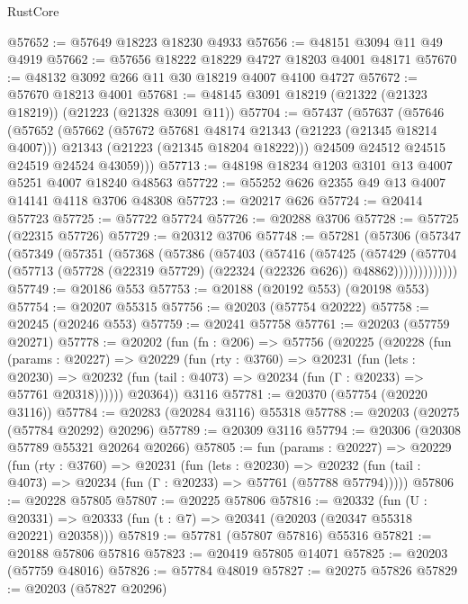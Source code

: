 \begin{lexlean}{RustCore}
\begin{coremodule}
@57652 := @57649 @18223 @18230 @4933
@57656 := @48151 @3094 @11 @49 @4919
@57662 := @57656 @18222 @18229 @4727 @18203 @4001 @48171
@57670 := @48132 @3092 @266 @11 @30 @18219 @4007 @4100 @4727
@57672 := @57670 @18213 @4001
@57681 := @48145 @3091 @18219 (@21322 (@21323 @18219)) (@21223 (@21328 @3091 @11))
@57704 := @57437
    (@57637
      (@57646
        (@57652
          (@57662
            (@57672 @57681 @48174 @21343 (@21223 (@21345 @18214 @4007)))
            @21343
            (@21223 (@21345 @18204 @18222)))
          @24509
          @24512
          @24515
          @24519
          @24524
          @43059)))
@57713 := @48198 @18234 @1203 @3101 @13 @4007 @5251 @4007 @18240 @48563
@57722 := @55252 @626 @2355 @49 @13 @4007 @14141 @4118 @3706 @48308
@57723 := @20217 @626
@57724 := @20414 @57723
@57725 := @57722 @57724
@57726 := @20288 @3706
@57728 := @57725 (@22315 @57726)
@57729 := @20312 @3706
@57748 := @57281
    (@57306
      (@57347
        (@57349
          (@57351
            (@57368
              (@57386
                (@57403
                  (@57416
                    (@57425
                      (@57429
                        (@57704
                          (@57713 (@57728 (@22319 @57729) (@22324 (@22326 @626)) @48862)))))))))))))
@57749 := @20186 @553
@57753 := @20188 (@20192 @553) (@20198 @553)
@57754 := @20207 @55315
@57756 := @20203 (@57754 @20222)
@57758 := @20245 (@20246 @553)
@57759 := @20241 @57758
@57761 := @20203 (@57759 @20271)
@57778 := @20202
    (fun (fn : @206) =>
    @57756
      (@20225
        (@20228
          (fun (params : @20227) =>
          @20229
            (fun (rty : @3760) =>
            @20231
              (fun (lets : @20230) =>
              @20232 (fun (tail : @4073) => @20234 (fun (Γ : @20233) => @57761 @20318))))))
        @20364))
    @3116
@57781 := @20370 (@57754 (@20220 @3116))
@57784 := @20283 (@20284 @3116) @55318
@57788 := @20203 (@20275 (@57784 @20292) @20296)
@57789 := @20309 @3116
@57794 := @20306 (@20308 @57789 @55321 @20264 @20266)
@57805 := fun (params : @20227) =>
  @20229
    (fun (rty : @3760) =>
    @20231
      (fun (lets : @20230) =>
      @20232 (fun (tail : @4073) => @20234 (fun (Γ : @20233) => @57761 (@57788 @57794)))))
@57806 := @20228 @57805
@57807 := @20225 @57806
@57816 := @20332
    (fun (U : @20331) => @20333 (fun (t : @7) => @20341 (@20203 (@20347 @55318 @20221) @20358)))
@57819 := @57781 (@57807 @57816) @55316
@57821 := @20188 @57806 @57816
@57823 := @20419 @57805 @14071
@57825 := @20203 (@57759 @48016)
@57826 := @57784 @48019
@57827 := @20275 @57826
@57829 := @20203 (@57827 @20296)

\end{coremodule}
\end{lexlean}
